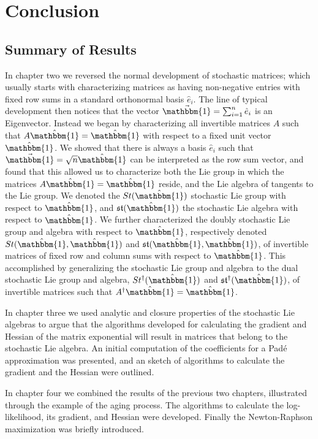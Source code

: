 \chapter{Conclusion}
\section{Summary of Results}
In chapter two we reversed the normal development of stochastic matrices; which usually
starts with characterizing matrices as having non-negative entries with fixed row sums in a
standard orthonormal basis $\hat{e}_i$. The line of typical development then notices that
the vector $\vec{\mathbbm{1}} = \sum_{i=1}^n \hat{e}_i$ is an Eigenvector. Instead we began
by characterizing all invertible matrices $A$ such that $A \hat{\mathbbm{1}} = \hat{\mathbbm{1}}$
with respect to a fixed unit vector $\hat{\mathbbm{1}}$. We showed that there is always a 
basis $\hat{e}_i$ such that $\vec{\mathbbm{1}} = \sqrt{n} \hat{\mathbbm{1}}$ can be
interpreted as the row sum vector, and found that this allowed us to characterize both the Lie 
group in which the matrices $A \hat{\mathbbm{1}} = \hat{\mathbbm{1}}$ reside, and the Lie
algebra of tangents to the Lie group. We denoted the $St(\hat{\mathbbm{1}})$ stochastic Lie
group with respect to $\hat{\mathbbm{1}}$, and $\mathfrak{st}(\hat{\mathbbm{1}})$ the
stochastic Lie algebra with respect to $\hat{\mathbbm{1}}$. We further characterized the
doubly stochastic Lie group and algebra with respect to $\hat{\mathbbm{1}}$, respectively 
denoted $St(\hat{\mathbbm{1}}, \hat{\mathbbm{1}})$ and $\mathfrak{st}(\hat{\mathbbm{1}}, \hat{\mathbbm{1}})$,
of invertible matrices of fixed row and column sums with respect to $\hat{\mathbbm{1}}$. 
This accomplished by generalizing the stochastic Lie group and algebra to the dual
stochastic Lie group and algebra, $St^\dagger(\hat{\mathbbm{1}})$ and $\mathfrak{st}^\dagger(\hat{\mathbbm{1}})$, 
of invertible matrices such that $A^\dagger \hat{\mathbbm{1}} = \hat{\mathbbm{1}}$.

In chapter three we used analytic and closure properties of the stochastic Lie algebras to
argue that the algorithms developed for calculating the gradient and Hessian of the matrix
exponential will result in matrices that belong to the stochastic Lie algebra. An initial
computation of the coefficients for a Pad\'{e} approximation was presented, and an sketch
of algorithms to calculate the gradient and the Hessian were outlined.

In chapter four we combined the results of the previous two chapters, illustrated through
the example of the aging process. The algorithms to calculate the log-likelihood, its
gradient, and Hessian were developed. Finally the Newton-Raphson maximization was briefly
introduced.
